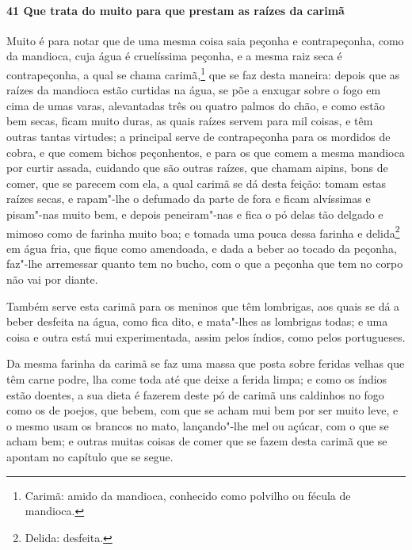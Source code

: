 \begin{linenumbers}
\paragraph{41 Que trata do muito para que prestam as raízes da carimã}\quad
Muito é para notar que de uma mesma coisa saia peçonha e contrapeçonha, como da mandioca,
cuja água é cruelíssima peçonha, e a mesma raiz seca é contrapeçonha, a qual se chama
carimã,\footnote{ Carimã: amido da mandioca, conhecido como polvilho ou fécula de
mandioca.} que se faz desta maneira: depois que as raízes da mandioca estão curtidas na
água, se põe a enxugar sobre o fogo em cima de umas varas, alevantadas três ou quatro
palmos do chão, e como estão bem secas, ficam muito duras, as quais raízes servem para mil
coisas, e têm outras tantas virtudes; a principal serve de contrapeçonha para os mordidos
de cobra, e que comem bichos peçonhentos, e para os que comem a mesma mandioca por curtir
assada, cuidando que são outras raízes, que chamam aipins, bons de comer, que se parecem
com ela, a qual carimã se dá desta feição: tomam estas raízes secas, e rapam"-lhe o
defumado da parte de fora e ficam alvíssimas e pisam"-nas muito bem, e depois peneiram"-nas
e fica o pó delas tão delgado e mimoso como de farinha muito boa; e tomada uma pouca dessa
farinha e delida\footnote{ Delida: desfeita.} em água fria, que fique como 
amendoada, e dada a beber ao tocado da peçonha, faz"-lhe arremessar quanto tem no bucho,
com o que a peçonha que tem no corpo não vai por diante.

Também serve esta carimã para os meninos que têm lombrigas, aos quais se dá a beber
desfeita na água, como fica dito, e mata"-lhes as lombrigas todas; e uma coisa e outra está
mui experimentada, assim pelos índios, como pelos portugueses.

Da mesma farinha da carimã se faz uma massa que posta sobre feridas velhas que têm carne
podre, lha come toda até que deixe a ferida limpa; e como os índios estão doentes, a sua
dieta é fazerem deste pó de carimã uns caldinhos no fogo como os de poejos, que bebem, com
que se acham mui bem por ser muito leve, e o mesmo usam os brancos no mato, lançando"-lhe
mel ou açúcar, com o que se acham bem; e outras muitas coisas de comer que se fazem desta
carimã que se apontam no capítulo que se segue.


\end{linenumbers}
